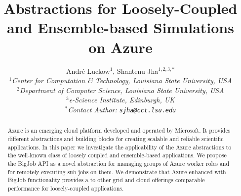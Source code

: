 \documentclass[conference,final]{IEEEtran}
\title{Abstractions for Loosely-Coupled and Ensemble-based Simulations
  on Azure\up}
\author{
Andr\'e Luckow$^{1}$, Shantenu Jha$^{1,2,3,*}$\\
  \small{\emph{$^{1}$Center for Computation \& Technology, Louisiana State University, USA}}\\
  \small{\emph{$^{2}$Department of Computer Science, Louisiana State University, USA}}\\
  \small{\emph{$^{3}$e-Science Institute, Edinburgh, UK}}\\
  \small{\emph{$^{*}$Contact Author: \texttt{sjha@cct.lsu.edu}}}\\
  \up\up\up\up
}
\newcommand{\up}{\vspace*{-1em}}
\begin{document}
 

\maketitle    

\begin{abstract}
  Azure is an emerging cloud platform developed and operated by
  Microsoft.  It provides different abstractions and building blocks
  for creating scalable and reliable scientific applications.  In this
  paper we investigate the applicability of the Azure abstractions to
  the well-known class of loosely coupled and ensemble-based
  applications.  We propose the BigJob API as a novel abstraction for
  managing groups of Azure worker roles and for remotely executing
  sub-jobs on them. We demonstrate that Azure enhanced with BigJob
  functionality provides a to other grid and cloud
  offerings comparable performance for loosely-coupled applications.  \up \up

\end{abstract}
\end{document}
